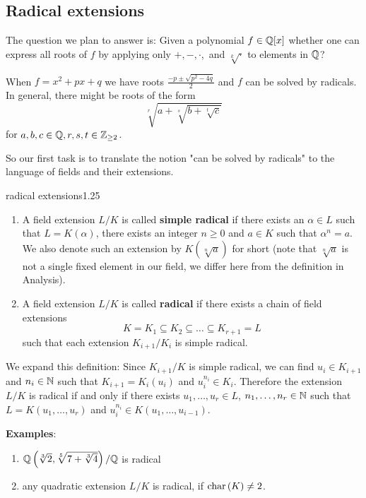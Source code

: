 \documentclass[twoside = false,	%
		headsepline,		%
		parskip = true,
		]{scrbook}						%
\begin{document}
    \subsection{Radical extensions}
        The question we plan to answer is: Given a polynomial $f\in\mathbb Q[x]$ whether one can express all roots of $f$ by applying only $+,-,\cdot$,\textdiv \ and $\sqrt[k]\cdot$ to elements in $\mathbb Q$?
        
        When $f=x^2+px+q$ we have roots $\frac{-p\pm\sqrt{p^2-4q}}2$ and $f$ can be solved by radicals. In general, there might be roots of the form $$\sqrt[r]{a+\sqrt[s]{b+\sqrt[t]{c}}}$$
        for $a,b,c\in\mathbb Q, r,s,t\in\mathbb Z_{\geq 2}$.
        
        So our first task is to translate the notion "can be solved by radicals" to the language of fields and their extensions.
        \begin{definition}{radical extensions}{1.25}
            \begin{enumerate}
                \item A field extension $L/K$ is called \textbf{simple radical} if there exists an $\alpha \in L$ such that $L=K(\alpha)$, there exists an integer $n\geq 0$ and $a\in K$ such that $\alpha^n=a$. We also denote such an extension by $K(\sqrt[n]a)$ for short (note that $\sqrt[n]a$ is not a single fixed element in our field, we differ here from the definition in Analysis).
                \item A field extension $L/K$ is called \textbf{radical} if there exists a chain of field extensions $$K=K_1\subseteq K_2\subseteq\dots\subseteq K_{r+1}= L$$
                such that each extension $K_{i+1}/K_i$ is simple radical.
            \end{enumerate}
        \end{definition}
        We expand this definition: Since $K_{i+1}/K$ is simple radical, we can find $u_i\in K_{i+1}$ and $n_i\in\mathbb N$ such that $K_{i+1}=K_i(u_i)$ and $u_i^{n_i}\in K_i$. Therefore the extension $L/K$ is radical if and only if there exists $u_1,\dots,u_r\in L$, $n_1,\dots,n_r\in \mathbb N$ such that $L=K(u_1,\dots,u_r)$ and $u_i^{n_i}\in K(u_1,\dots,u_{i-1})$.
        
        \textbf{Examples}:
        \begin{enumerate}
            \item $\mathbb Q \left( \sqrt[3]2, \sqrt[5]{7+\sqrt[3]{4}} \right)/\mathbb Q$ is radical
            \item any quadratic extension $L/K$ is radical, if $\mathrm{char} \,(K) \neq 2$.
        \end{enumerate}
\end{document}
